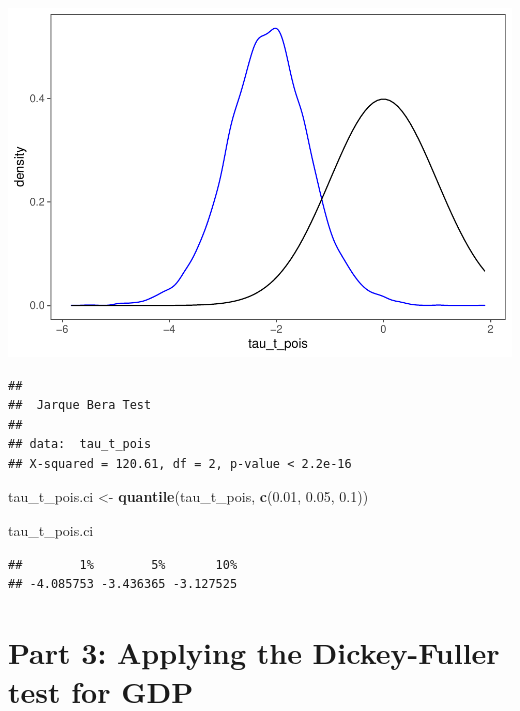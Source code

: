 \documentclass[
]{article}
\newenvironment{Shaded}{\begin{snugshade}}{\end{snugshade}}
\newcommand{\CommentTok}[1]{\textcolor[rgb]{0.56,0.35,0.01}{\textit{#1}}}
\newcommand{\FloatTok}[1]{\textcolor[rgb]{0.00,0.00,0.81}{#1}}
\newcommand{\KeywordTok}[1]{\textcolor[rgb]{0.13,0.29,0.53}{\textbf{#1}}}
\newcommand{\NormalTok}[1]{#1}
\newcommand{\StringTok}[1]{\textcolor[rgb]{0.31,0.60,0.02}{#1}}
\begin{document}
\begin{center}\includegraphics{Econo2_P6_files/figure-latex/monte carlo poisson-1} \end{center}

\begin{Shaded}
\end{Shaded}

\begin{verbatim}
## 
##  Jarque Bera Test
## 
## data:  tau_t_pois
## X-squared = 120.61, df = 2, p-value < 2.2e-16
\end{verbatim}

\begin{Shaded}
\begin{Highlighting}[]
\NormalTok{tau_t_pois.ci <-}\StringTok{ }\KeywordTok{quantile}\NormalTok{(tau_t_pois, }\KeywordTok{c}\NormalTok{(}\FloatTok{0.01}\NormalTok{, }\FloatTok{0.05}\NormalTok{, }\FloatTok{0.1}\NormalTok{))}

\NormalTok{tau_t_pois.ci}
\end{Highlighting}
\end{Shaded}

\begin{verbatim}
##        1%        5%       10% 
## -4.085753 -3.436365 -3.127525
\end{verbatim}

\section{Part 3: Applying the Dickey-Fuller test for GDP}
\end{document}
